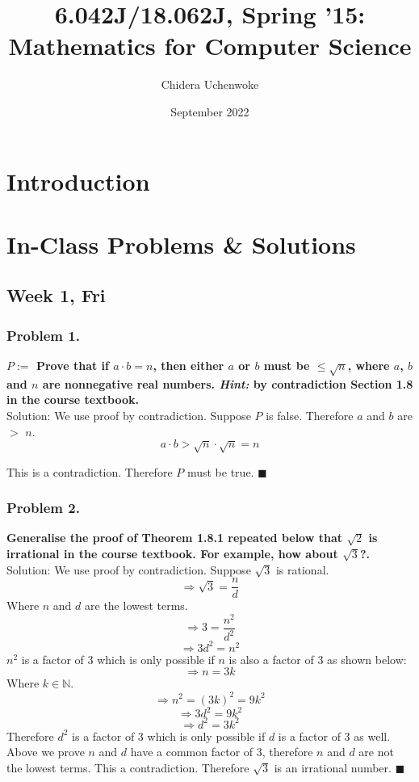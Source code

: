 \documentclass{article}
\title{6.042J/18.062J, Spring '15: Mathematics for Computer Science}
\author{Chidera Uchenwoke}
\date{September 2022}
\begin{document}
\maketitle
\tableofcontents

\section{Introduction}

\section{In-Class Problems \& Solutions}
\subsection{Week 1, Fri}

\subsubsection{Problem 1.}
\textbf{\(P := \) Prove that if $a \cdot b = n $, then either $a$ or $b$ must be $\leq \sqrt{n}$, where $a$, $b$ and $n$ are nonnegative real numbers. \textit{Hint:} by contradiction Section 1.8 in the course textbook.}
\\[5pt]
Solution: We use proof by contradiction. Suppose \(P\) is false. Therefore \(a\) and \(b\) are \(>\) \(n\).
\[a \cdot b > \sqrt{n} \cdot \sqrt{n} = n\]

\noindent This is a contradiction. Therefore \(P\) must be true.
$ \blacksquare $

\subsubsection{Problem 2.}
\textbf{Generalise the proof of Theorem 1.8.1 repeated below that $\sqrt{2}$ is irrational in the course textbook. For example, how about $\sqrt{3}$?.}
\\[5pt]
Solution: We use proof by contradiction. Suppose \(\sqrt{3}\) is rational. 
\[\Rightarrow \sqrt{3} = \frac{n}{d}\]
Where \(n\) and \(d\) are the lowest terms.
\[\Rightarrow 3 = \frac{n^2}{d^2}\]
\[\Rightarrow 3d^2 = n^2 \]
\(n^2\) is a factor of 3 which is only possible if \(n\) is also a factor of 3 as shown below:
\[\Rightarrow n = 3k\]
Where \(k \in \mathbb{N}\).
\[\Rightarrow n^2 = (3k)^2 = 9k^2\]
\[\Rightarrow 3d^2 = 9k^2\]
\[\Rightarrow d^2 = 3k^2\]
Therefore \(d^2\) is a factor of 3 which is only possible if \(d\) is a factor of 3 as well.
\\[5pt]
Above we prove \(n\) and \(d\) have a common factor of 3, therefore \(n\) and \(d\) are not the lowest terms. This a contradiction. Therefore $\sqrt{3}$ is an irrational number.
$\blacksquare$
\end{document}
